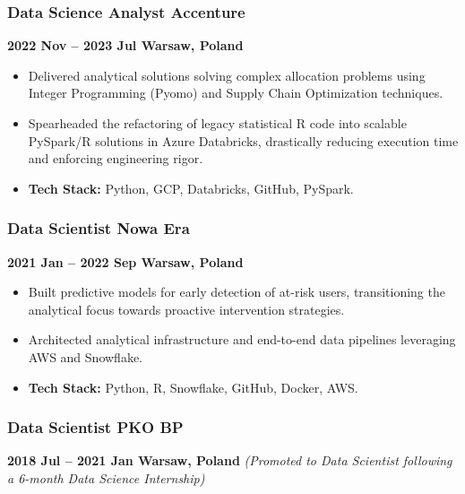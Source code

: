 \documentclass[
  9pt,
  letterpaper,
  DIV=11,
  numbers=noendperiod]{scrartcl}
\providecommand{\tightlist}{%
  \setlength{\itemsep}{0pt}\setlength{\parskip}{0pt}}\usepackage{longtable,booktabs,array}
\begin{document}
\hypertarget{data-science-analyst-accenture}{%
\subsubsection{Data Science Analyst \textbar{}
Accenture}\label{data-science-analyst-accenture}}

\textbf{2022 Nov -- 2023 Jul \textbar{} Warsaw, Poland}

\begin{itemize}
\tightlist
\item
  Delivered analytical solutions solving complex allocation problems
  using Integer Programming (Pyomo) and Supply Chain Optimization
  techniques.
\item
  Spearheaded the refactoring of legacy statistical R code into scalable
  PySpark/R solutions in Azure Databricks, drastically reducing
  execution time and enforcing engineering rigor.
\item
  \textbf{Tech Stack:} Python, GCP, Databricks, GitHub, PySpark.
\end{itemize}

\hypertarget{data-scientist-nowa-era}{%
\subsubsection{Data Scientist \textbar{} Nowa
Era}\label{data-scientist-nowa-era}}

\textbf{2021 Jan -- 2022 Sep \textbar{} Warsaw, Poland}

\begin{itemize}
\tightlist
\item
  Built predictive models for early detection of at-risk users,
  transitioning the analytical focus towards proactive intervention
  strategies.
\item
  Architected analytical infrastructure and end-to-end data pipelines
  leveraging AWS and Snowflake.
\item
  \textbf{Tech Stack:} Python, R, Snowflake, GitHub, Docker, AWS.
\end{itemize}

\hypertarget{data-scientist-pko-bp}{%
\subsubsection{Data Scientist \textbar{} PKO
BP}\label{data-scientist-pko-bp}}

\textbf{2018 Jul -- 2021 Jan \textbar{} Warsaw, Poland} \emph{(Promoted
to Data Scientist following a 6-month Data Science Internship)}
\end{document}
